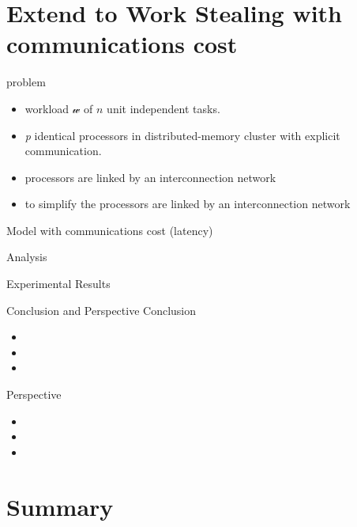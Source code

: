 \documentclass{beamer}
\begin{document}
\section{Extend to Work Stealing with communications cost}

\begin{frame}{problem}
    \begin{alertblock}{ }
        
    \end{alertblock}
  \begin{itemize}
        \item {workload $\mathcal{w}$ of $n$ unit independent tasks.}
        \item {\emph{p} identical processors in distributed-memory cluster
            \alert{with explicit communication}.}
        \item {processors are linked by an interconnection network}
        \item {to simplify the processors are linked by an interconnection network}


    \end{itemize}
\end{frame}

\begin{frame}{Model with communications cost (latency)}

\end{frame}

\begin{frame}{Analysis}
\end{frame}

\begin{frame}{Experimental Results}

\end{frame}




\begin{frame}{Conclusion and Perspective}
    Conclusion
  \begin{itemize}
        \item 
        \item 
        \item 
    \end{itemize}
       
   Perspective
  \begin{itemize}
        \item 
        \item 
        \item 
    \end{itemize}
\end{frame}






\section*{Summary}
\end{document}

